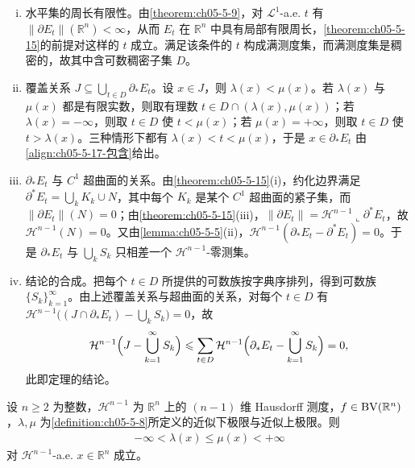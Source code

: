 \documentclass[../../main.tex]{subfiles}%
\begin{document}
\begin{remark}\label{remark:ch05-thm-5-17-论证}
\begin{enumerate}[(i)]
\item 水平集的周长有限性。由\cref{theorem:ch05-5-9}，对 $\mathcal{L}^1$-a.e. $t$ 有 $\lVert\partial E_t\rVert(\mathbb{R}^n)<\infty$，从而 $E_t$ 在 $\mathbb{R}^n$ 中具有局部有限周长，\cref{theorem:ch05-5-15}的前提对这样的 $t$ 成立。满足该条件的 $t$ 构成满测度集，而满测度集是稠密的，故其中含可数稠密子集 $D$。%
\item 覆盖关系 $J\subseteq\bigcup_{t\in D}\partial_*E_t$。设 $x\in J$，则 $\lambda(x)<\mu(x)$。若 $\lambda(x)$ 与 $\mu(x)$ 都是有限实数，则取有理数 $t\in D\cap(\lambda(x),\mu(x))$；若 $\lambda(x)=-\infty$，则取 $t\in D$ 使 $t<\mu(x)$；若 $\mu(x)=+\infty$，则取 $t\in D$ 使 $t>\lambda(x)$。三种情形下都有 $\lambda(x)<t<\mu(x)$，于是 $x\in\partial_*E_t$ 由\eqref{align:ch05-5-17-包含}给出。
\item $\partial_*E_t$ 与 $C^1$ 超曲面的关系。由\cref{theorem:ch05-5-15}(i)，约化边界满足 $\partial^*E_t=\bigcup_{k}K_k\cup N$，其中每个 $K_k$ 是某个 $C^1$ 超曲面的紧子集，而 $\lVert\partial E_t\rVert(N)=0$；由\cref{theorem:ch05-5-15}(iii)，$\lVert\partial E_t\rVert=\mathcal{H}^{n-1}\llcorner\partial^*E_t$，故 $\mathcal{H}^{n-1}(N)=0$。又由\cref{lemma:ch05-5-5}(ii)，$\mathcal{H}^{n-1}(\partial_*E_t-\partial^*E_t)=0$。于是 $\partial_*E_t$ 与 $\bigcup_{k}S_k$ 只相差一个 $\mathcal{H}^{n-1}$-零测集。%
\item 结论的合成。把每个 $t\in D$ 所提供的可数族按字典序排列，得到可数族 $\{S_k\}_{k=1}^{\infty}$。由上述覆盖关系与超曲面的关系，对每个 $t\in D$ 有 $\mathcal{H}^{n-1}\bigl((J\cap\partial_*E_t)-\bigcup_{k}S_k\bigr)=0$，故
\begin{align*}
\mathcal{H}^{n-1}\Bigl(J-\bigcup_{k=1}^{\infty}S_k\Bigr)\leqslant\sum_{t\in D}\mathcal{H}^{n-1}\Bigl(\partial_*E_t-\bigcup_{k=1}^{\infty}S_k\Bigr)=0 ,
\end{align*}
此即定理的结论。
\end{enumerate}
\end{remark}

\begin{theorem}[近似上极限与近似下极限的有限性]\label{theorem:ch05-5-18}
设 $n\geqslant2$ 为整数，$\mathcal{H}^{n-1}$ 为 $\mathbb{R}^n$ 上的 $(n-1)$ 维 Hausdorff 测度，$f\in\mathrm{BV}(\mathbb{R}^n)$，$\lambda,\mu$ 为\cref{definition:ch05-5-8}所定义的近似下极限与近似上极限。则 %
\begin{align*}
-\infty<\lambda(x)\leqslant\mu(x)<+\infty
\end{align*}
对 $\mathcal{H}^{n-1}$-a.e. $x\in\mathbb{R}^n$ 成立。
\end{theorem}
\end{document}
